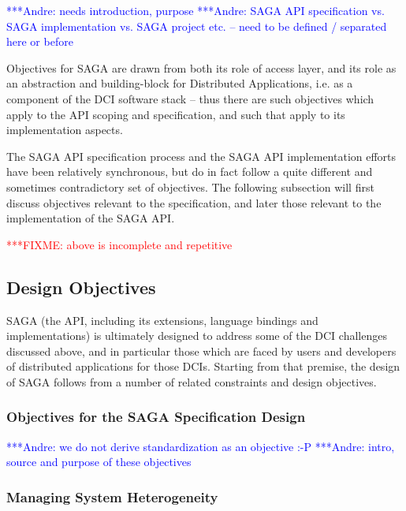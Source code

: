\documentclass[a4paper,12pt]{article}
\newcommand{\amnote}[1]{   {\textcolor{blue} { ***Andre:    #1 }}}
\newcommand{\fixme}[1]{    {\textcolor{red}  { ***FIXME:    #1 }}}
\newcommand{\amnote}[1]{}
\newcommand{\fixme}[1]{}
\begin{document}
 \amnote{needs introduction, purpose} \amnote{SAGA API specification
 vs. SAGA implementation vs. SAGA project etc. -- need to be defined
 /  separated here or before}

 Objectives for SAGA are drawn from both its role of access layer, and
 its role as an abstraction and building-block for Distributed
 Applications, i.e. as a component of the DCI software stack -- thus
 there are such objectives which apply to the API scoping and
 specification, and such that apply to its implementation aspects.

 The SAGA API specification process and the SAGA API implementation
 efforts have been relatively synchronous, but do in fact follow
 a quite different and sometimes contradictory set of objectives.  The
 following subsection will first discuss objectives relevant to the
 specification, and later those relevant to the implementation of the
 SAGA API.
 
 \fixme{above is incomplete and repetitive}



 \subsection{Design Objectives}


  SAGA (the API, including its extensions, language bindings and
  implementations) is ultimately designed to address some of the DCI
  challenges discussed above, and in particular those which are faced
  by users and developers of distributed applications for those DCIs.
  Starting from that premise, the design of SAGA follows from a number
  of related constraints and design objectives.


  \subsubsection{Objectives for the SAGA Specification Design}
  \label{sec.obj.spec}

   \amnote{we do not derive standardization as an objective :-P}
   \amnote{intro, source and purpose of these objectives}

   \subsubsection*{Managing System Heterogeneity}
   \label{ssec.obj.heter}

\end{document}
